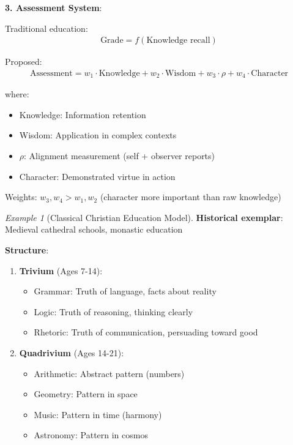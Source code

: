 \documentclass[11pt,a4paper]{article}
\theoremstyle{definition}
\theoremstyle{remark}
\newtheorem{example}{Example}[section]
\begin{document}
\begin{enumerate}
\begin{protocol}
\begin{protocol}
\textbf{3. Assessment System}:

Traditional education:
\begin{align}
\text{Grade} = f(\text{Knowledge recall})
\end{align}

Proposed:
\begin{align}
\text{Assessment} = w_1 \cdot \text{Knowledge} + w_2 \cdot \text{Wisdom} + w_3 \cdot \rho + w_4 \cdot \text{Character}
\end{align}

where:
\begin{itemize}
    \item Knowledge: Information retention
    \item Wisdom: Application in complex contexts
    \item \(\rho\): Alignment measurement (self + observer reports)
    \item Character: Demonstrated virtue in action
\end{itemize}

Weights: \(w_3, w_4 > w_1, w_2\) (character more important than raw knowledge)
\end{protocol}

\begin{example}[Classical Christian Education Model]
\textbf{Historical exemplar}: Medieval cathedral schools, monastic education

\textbf{Structure}:
\begin{enumerate}
    \item \textbf{Trivium} (Ages 7-14):
        \begin{itemize}
            \item Grammar: Truth of language, facts about reality
            \item Logic: Truth of reasoning, thinking clearly
            \item Rhetoric: Truth of communication, persuading toward good
        \end{itemize}
    
    \item \textbf{Quadrivium} (Ages 14-21):
        \begin{itemize}
            \item Arithmetic: Abstract pattern (numbers)
            \item Geometry: Pattern in space
            \item Music: Pattern in time (harmony)
            \item Astronomy: Pattern in cosmos
        \end{itemize}
    

\end{enumerate}
\end{example}
\end{protocol}
\end{enumerate}
\end{document}
